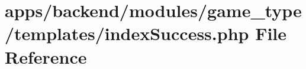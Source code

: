 \hypertarget{backend_2modules_2game__type_2templates_2index_success_8php}{\section{apps/backend/modules/game\-\_\-type/templates/index\-Success.php File Reference}
\label{backend_2modules_2game__type_2templates_2index_success_8php}
}
